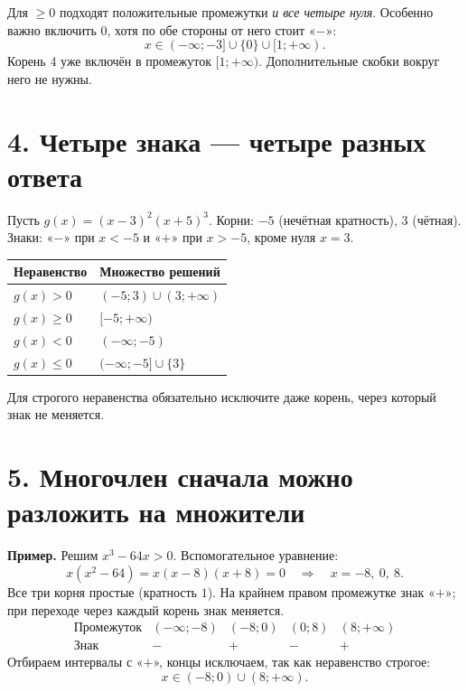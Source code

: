 \documentclass[a4paper,12pt]{article}
\newcommand{\key}[1]{{\color{darkaccent}\textbf{#1}}}
\newcommand{\note}[1]{{\small\color{quiet}#1}}
\newcommand{\headsec}[1]{\section*{\color{darkaccent}#1}\vspace{-6pt}{\color{hair}\rule{\linewidth}{0.55pt}}\par\vspace{2pt}}
\begin{document}
\begin{center}
\end{center}
Для \(\ge0\) подходят положительные промежутки \emph{и все четыре нуля}.
Особенно важно включить \(0\), хотя по обе стороны от него стоит «\(-\)»:
\[
\boxed{x\in(-\infty;-3]\cup\{0\}\cup[1;+\infty)}.
\]
\note{Корень \(4\) уже включён в промежуток \([1;+\infty)\). Дополнительные скобки вокруг него не нужны.}

\clearpage
\headsec{4. Четыре знака --- четыре разных ответа}
Пусть \(g(x)=(x-3)^2(x+5)^3\). Корни: \(-5\) (нечётная кратность),
\(3\) (чётная). Знаки: «\(-\)» при \(x<-5\) и «\(+\)» при \(x>-5\),
кроме нуля \(x=3\).
\renewcommand{\arraystretch}{1.28}
\begin{center}
\begin{tabularx}{\linewidth}{@{}lX@{}}
\toprule
\textbf{Неравенство} & \textbf{Множество решений}\\
\midrule
\(g(x)>0\) & \((-5;3)\cup(3;+\infty)\)\\
\(g(x)\ge0\) & \([-5;+\infty)\)\\
\(g(x)<0\) & \((-\infty;-5)\)\\
\(g(x)\le0\) & \((-\infty;-5]\cup\{3\}\)\\
\bottomrule
\end{tabularx}
\end{center}
\note{Для строгого неравенства обязательно исключите даже корень, через который знак не меняется.}


\headsec{5. Многочлен сначала можно разложить на множители}
\key{Пример.} Решим \(x^3-64x>0\). Вспомогательное уравнение:
\[
x(x^2-64)=x(x-8)(x+8)=0
\quad\Longrightarrow\quad x=-8,\ 0,\ 8.
\]
Все три корня простые (кратность \(1\)). На крайнем правом промежутке знак «\(+\)»;
при переходе через каждый корень знак меняется.
\[
\begin{array}{c|cccc}
\text{Промежуток} & (-\infty;-8)&(-8;0)&(0;8)&(8;+\infty)\\ \hline
\text{Знак}&-&+&-&+
\end{array}
\]
Отбираем интервалы с «\(+\)», концы исключаем, так как неравенство строгое:
\[
\boxed{x\in(-8;0)\cup(8;+\infty)}.
\]
\end{document}
